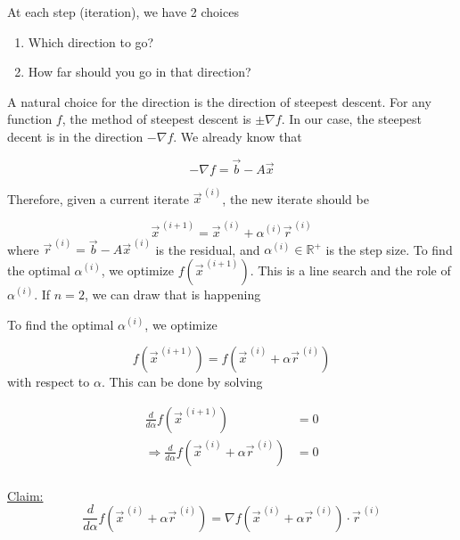 At each step (iteration), we have 2 choices

\begin{enumerate}[1)]
    \item Which direction to go?
    \item How far should you go in that direction?
\end{enumerate}

A natural choice for the direction is the direction of steepest descent. For any function $f$, the method of steepest descent is $\pm \nabla f$. In our case, the steepest decent is in the direction $-\nabla f$. We already know that

\begin{equation*}
    -\nabla f = \vec{b} - A \vec{x}
\end{equation*}



Therefore, given a current iterate $\vec{x}^{\,(i)}$, the new iterate should be

\begin{equation*}
    \vec{x}^{\,(i+1)} = \vec{x}^{\,(i)} + \alpha^{(i)}\vec{r}^{\,(i)}
\end{equation*}
where $\vec{r}^{\,(i)} = \vec{b} - A\vec{x}^{\,(i)}$ is the residual, and $\alpha^{(i)}\in\mathbb{R}^{+}$ is the step size. To find the optimal $\alpha^{(i)}$, we optimize $f\left(\vec{x}^{\,(i+1)}\right)$. This is a line search and the role of $\alpha^{(i)}$. If $n=2$, we can draw that is happening

\begin{center}
    
\end{center}

To find the optimal $\alpha^{(i)}$, we optimize

\begin{equation*}
    f\left(\vec{x}^{\,(i+1)}\right) = f\left(\vec{x}^{\,(i)} + \alpha\vec{r}^{\,(i)}\right)
\end{equation*}
with respect to $\alpha$. This can be done by solving

\begin{align*}
    \frac{d}{d\alpha}f\left(\vec{x}^{\,(i+1)}\right) &= 0\\
    \Rightarrow \frac{d}{d\alpha}f\left(\vec{x}^{\,(i)} + \alpha\vec{r}^{\,(i)}\right) &= 0\\
\end{align*}

\underline{Claim:}
\begin{equation*}
         \frac{d}{d\alpha}f\left(\vec{x}^{\,(i)} + \alpha\vec{r}^{\,(i)}\right) = \nabla f\left(\vec{x}^{\,(i)} + \alpha\vec{r}^{\,(i)}\right)\cdot \vec{r}^{\,(i)}
\end{equation*}

